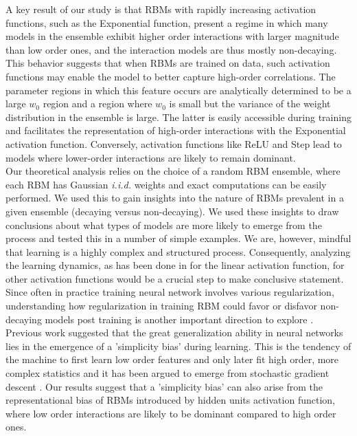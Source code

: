 \documentclass[11pt,letterpaper]{article}
\renewcommand{\red}[1]{#1}
\begin{document}
A key result of our study is that RBMs with rapidly increasing activation functions, such as the Exponential function, present a regime in which many models in the ensemble exhibit higher order interactions with larger magnitude than low order ones, and the interaction models are thus mostly non-decaying. This behavior suggests that when RBMs are trained on data, such activation functions may enable the model to better capture high-order correlations. The parameter regions in which this feature occurs are analytically determined to be a large $w_0$ region and a region where $w_0$ is small but the variance of the weight distribution in the ensemble is large. The latter is easily accessible during training and facilitates the representation of high-order interactions with the Exponential activation function. Conversely, activation functions like ReLU and Step lead to models where lower-order interactions are likely to remain dominant.\\
Our theoretical analysis relies on the choice of a random RBM ensemble, where each RBM has Gaussian \textit{i.i.d.} weights and exact computations can be easily performed. {\red We used this to gain insights into the nature of RBMs prevalent in a given ensemble (decaying versus non-decaying). We used these insights to draw conclusions about what types of models are more likely to emerge from the process and tested this in a number of simple examples. We are, however, mindful that learning is a highly complex and structured process. Consequently, analyzing the learning dynamics, as has been done in \cite{fachechi2025fundamental} for the linear activation function, for other activation functions would be a crucial step to make conclusive statement. Since often in practice training neural network involves various regularization, understanding how regularization in training RBM could favor or disfavor non-decaying models post training is another important direction to explore \cite{Ventura_2024}.}\\ 
Previous work suggested that the great generalization ability in neural networks lies in the emergence of a 'simplicity bias' during learning. This is the tendency of the machine to first learn low order features and only later fit high order, more complex statistics \cite{shah2020pitfalls, rende2024distributional} and it has been argued to emerge from stochastic gradient descent \cite{refinetti2023neural}. Our results suggest that a 'simplicity bias' can also arise from the representational bias of RBMs introduced by hidden units activation function, where low order interactions are likely to be dominant compared to high order ones.\\
\end{document}
